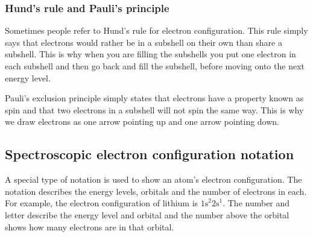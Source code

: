             \subsubsection*{Hund's rule and Pauli's principle}
            \nopagebreak
            \label{m38741*eip-188}
Sometimes people refer to Hund's rule for electron configuration. This rule simply says that electrons would rather be in a subshell on their own than share a subshell. This is why when you are filling the subshells you put one electron in each subshell and then go back and fill the subshell, before moving onto the next energy level.
\par 
\label{m38741*eip-id1167385514309}
Pauli's exclusion principle simply states that electrons have a property known as spin and that two electrons in a subshell will not spin the same way. This is why we draw electrons as one arrow pointing up and one arrow pointing down.
\par \label{m38741*uid104}
\subsection*{Spectroscopic electron configuration notation}
        \label{m38741*id259749}A special type of notation is used to show an atom's electron configuration. The notation describes the energy levels, orbitals and the number of electrons in each. For example, the electron configuration of lithium is ${1\text{s}}^{2}{2\text{s}}^{1}$. The number and letter describe the energy level and orbital and the number above the orbital shows how many electrons are in that orbital. 

